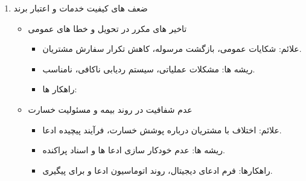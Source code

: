\documentclass[12pt,a4paper]{report}
\begin{document}
\begin{enumerate}
\begin{itemize}
\begin{itemize}
ذخیره سازی اطلاعات حساس بدون مراقبت ، قرار داد های ناقص با طرف سوم.
		\item ریشه ها:
عدم توجه به مقررات و نبود سیاست های داخلی.
		\item تاثیر ها:
ریسک جریمه و لطمه به برند.
		\item راهکار ها:
تدوین سیاست های حریم خصوصی ، قرار داد های  یا شرکا و ممیزی اینترنی.
	\end{itemize}
	\item فقدان برنامه بازیابی از حادثه و پایداری
	\begin{itemize}
		\item علائم:
نبود بکاپ منظم، قطع سرویس به مدت طولانی در زمان بروز مشکل.
		\item ریشه ها:
هزینه اولیه، غفلت برنامه ریزی.
		\item تاثیر:
توقف عملیات و ضرر مالی.
		\item راهکارها:
تست دوره ای بازیابی ،  و 
	\end{itemize}
\end{itemize}
\item ضعف های کیفیت خدمات و اعتبار برند
\begin{itemize}
	\item تاخیر های مکرر در تحویل و خطا های عمومی 
	\begin{itemize}
		\item علائم:
	شکایات عمومی، بازگشت مرسوله، کاهش تکرار سفارش مشتریان.
		\item ریشه ها:
	مشکلات عملیاتی، سیستم ردیابی ناکافی،  نامناسب.
		\item راهکار ها:
	\end{itemize}
	\item  عدم شفافیت در روند بیمه و مسئولیت خسارت
	\begin{itemize}
		\item علائم:
اختلاف با مشتریان درباره پوشش خسارت، فرآیند پیچیده ادعا.
		\item ریشه ها:
عدم خودکار سازی ادعا ها و اسناد پراکنده.
		\item راهکارها:
	فرم ادعای دیجیتال، روند اتوماسیون ادعا و  برای پیگیری.
	\end{itemize}
\end{itemize}
\end{enumerate}
\newpage
\end{document}
